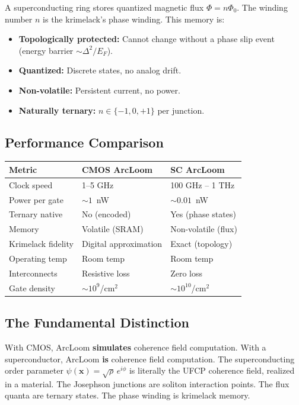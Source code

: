 \documentclass[11pt, a4paper]{article}
\begin{document}
A superconducting ring stores quantized magnetic flux
$\Phi = n\Phi_0$. The winding number $n$ is the krimelack's
phase winding. This memory is:
\begin{itemize}[nosep]
  \item \textbf{Topologically protected:} Cannot change without
        a phase slip event (energy barrier $\sim \Delta^2/E_F$).
  \item \textbf{Quantized:} Discrete states, no analog drift.
  \item \textbf{Non-volatile:} Persistent current, no power.
  \item \textbf{Naturally ternary:} $n \in \{-1, 0, +1\}$ per
        junction.
\end{itemize}

\subsection{Performance Comparison}

\begin{center}
\begin{tabular}{@{}lll@{}}
\toprule
\textbf{Metric} & \textbf{CMOS ArcLoom} & \textbf{SC ArcLoom} \\
\midrule
Clock speed & 1--5 GHz & 100 GHz -- 1 THz \\
Power per gate & $\sim 1$~nW & $\sim 0.01$~nW \\
Ternary native & No (encoded) & Yes (phase states) \\
Memory & Volatile (SRAM) & Non-volatile (flux) \\
Krimelack fidelity & Digital approximation & Exact (topology) \\
Operating temp & Room temp & Room temp \\
Interconnects & Resistive loss & Zero loss \\
Gate density & $\sim 10^9$/cm$^2$ & $\sim 10^{10}$/cm$^2$ \\
\bottomrule
\end{tabular}
\end{center}

\subsection{The Fundamental Distinction}

With CMOS, ArcLoom \textbf{simulates} coherence field computation.
With a superconductor, ArcLoom \textbf{is} coherence field
computation. The superconducting order parameter
$\psi(\mathbf{x}) = \sqrt{\rho}\, e^{i\phi}$ is literally the
UFCP coherence field, realized in a material. The Josephson
junctions are soliton interaction points. The flux quanta are
ternary states. The phase winding is krimelack memory.
\end{document}
